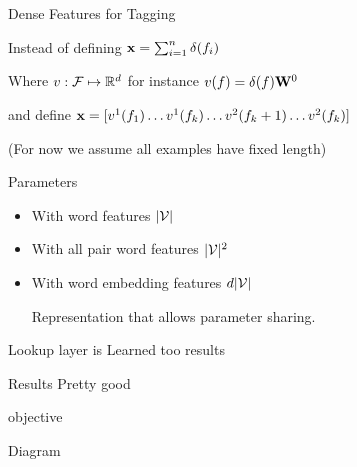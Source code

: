 \documentclass{beamer}
\begin{document}
\begin{frame}{Dense Features for Tagging}
  
  Instead of defining $\mathbf{x} = \sum_{i=1}^n \delta(f_i)$ 


  Where $v : \mathcal{F} \mapsto \mathbb{R}^d$ for instance $v(f) = \delta(f) \mathbf{W}^0$ 

  and define  $\mathbf{x} = [ v^1(f_1) \ldots v^1(f_k) \ldots v^2(f_k+1) \ldots v^2(f_k)] $ 

  (For now we assume all examples have fixed length) 

\end{frame}




\begin{frame}{Parameters}
  \begin{itemize}
  \item With word features $|\mathcal{V}|$ 

  \item With all pair word features $|\mathcal{V}|^2$ 


  \item With word embedding features $d |\mathcal{V}|$ 
    
    Representation that allows parameter sharing.
  \end{itemize}  
\end{frame}




\begin{frame}{Lookup layer is Learned too}
  results
\end{frame}

\begin{frame}
  Results 
  Pretty good
  \begin{table}
    \centering
    
  \end{table}
\end{frame}

\begin{frame}{}
  objective

  Diagram 
\end{frame}
\end{document}
